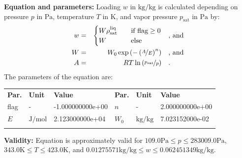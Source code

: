 \textbf{Equation and parameters:}
\newline
%
Loading $w$ in $\si{\kilogram\per\kilogram}$ is calculated depending on pressure $p$ in $\si{\pascal}$, temperature $T$ in $\si{\kelvin}$, and vapor pressure $p_\mathrm{sat}$ in $\si{\pascal}$ by:
%
\begin{equation*}
\begin{split}
w &=& \begin{cases} W \rho_\mathrm{sat}^{\mathrm{liq}} & \quad \text{if flag} \geq 0 \\ W & \quad \text{else} \end{cases} & \quad\text{, and} \\
W &=& W_0 \exp \left( - \left( \nicefrac{A}{E} \right) ^{n} \right) & \quad\text{, and} \\
A &=& R T \ln \left( \nicefrac{p_\mathrm{sat}}{p} \right) & \quad\text{.} \\
\end{split}
\end{equation*}
%
The parameters of the equation are:
%
\begin{longtable}[l]{lll|lll}
\toprule
\addlinespace
\textbf{Par.} & \textbf{Unit} & \textbf{Value} &	\textbf{Par.} & \textbf{Unit} & \textbf{Value} \\
\addlinespace
\midrule
\endhead

\bottomrule
\endfoot
\bottomrule
\endlastfoot
\addlinespace

flag & - & -1.000000000e+00 & $n$ & - & 2.000000000e+00 \\
$E$ & $\si{\joule\per\mole}$ & 2.123000000e+04 & $W_0$ & $\si{\kilogram\per\kilogram}$ & 7.023152000e-02 \\

\addlinespace\end{longtable}

\textbf{Validity:}
\newline
Equation is approximately valid for $109.0 \si{\pascal} \leq p \leq 283009.0 \si{\pascal}$,  $343.0 \si{\kelvin} \leq T \leq 423.0 \si{\kelvin}$, and $0.01275571 \si{\kilogram\per\kilogram} \leq w \leq 0.062451349 \si{\kilogram\per\kilogram}$.
\newline

